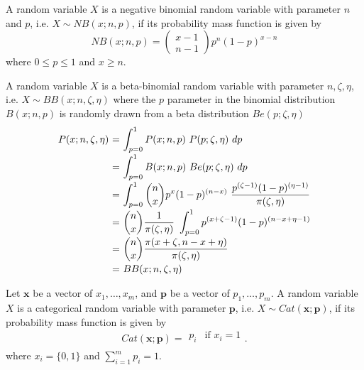 \begin{definition2}
	A random variable $X$ is a negative binomial random variable with parameter $n$ and $p$, i.e. $X \sim NB(x ; n, p)$, if its probability mass function is given by
	\[
	NB(x ; n, p) = \begin{pmatrix} x - 1 \\ n - 1 \end{pmatrix} p^n (1 - p)^{x-n}
	\]
	\noindent where $0 \leq p \leq 1$ and $x \geq n$.
\end{definition2}

\begin{definition2}
	A random variable $X$ is a beta-binomial random variable with parameter $n, \zeta, \eta$, i.e. $X \sim BB(x ; n, \zeta, \eta)$ where the $p$ parameter in the binomial distribution $B(x ; n, p)$ is randomly drawn from a beta distribution $Be(p ; \zeta, \eta)$ 
	\begin{equation*}
	\begin{tabular}{r@{ = }l}
	$P(x ; n, \zeta, \eta)$ & $\displaystyle\int_{p=0}^{1} P(x ; n, p) ~ P(p ; \zeta, \eta) ~dp$ \\ [2ex]
	& $\displaystyle\int_{p=0}^{1} B(x ; n, p) ~ Be(p ; \zeta, \eta) ~dp$ \\ [2ex]
	& $\displaystyle\int_{p=0}^{1} \binom{n}{x} p^x (1-p)^{(n-x)} ~ \displaystyle\frac{p^{(\zeta - 1)} (1-p)^{(\eta-1)}}{\pi(\zeta, \eta)}$ \\ [2ex]
	& $\displaystyle\binom nx \displaystyle\frac{1}{\pi(\zeta, \eta)} ~ \displaystyle\int_{p=0}^{1} p^{(x+\zeta-1)} (1-p)^{(n-x+\eta-1)}$ \\ [2ex]
	& $\displaystyle\binom nx \displaystyle\frac{\pi(x+\zeta, n-x+\eta)}{\pi(\zeta, \eta)}$ \\ [2ex]
	& $BB(x ; n, \zeta, \eta)$
	\end{tabular}
	\end{equation*}
\end{definition2}

\begin{definition2}
	Let $\mathbf{x}$ be a vector of $x_1, \ldots, x_m$, and $\mathbf p$ be a vector of $p_1, \ldots, p_m$. A random variable $X$ is a categorical random variable with parameter $\mathbf p$, i.e. $X \sim Cat(\mathbf x ; \mathbf p)$, if its probability mass function is given by
	\[
	Cat(\mathbf x ; \mathbf p) = \begin{matrix}
	p_i & \textrm{if } x_i = 1 \\
	\end{matrix}.
	\]
	\noindent where $x_i = \{0, 1\}$ and $\displaystyle\sum_{i=1}^{m} p_i = 1$.
\end{definition2}

